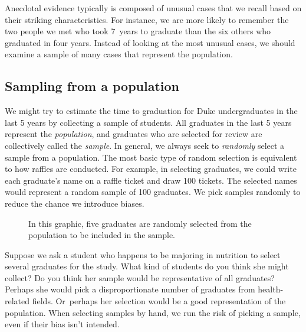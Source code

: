\D{\newpage}

Anecdotal evidence typically is composed of unusual cases that we recall based on their striking characteristics. For instance, we are more likely to remember the two people we met who took 7~years to graduate than the six others who graduated in four years. Instead of looking at the most unusual cases, we should examine a sample of many cases that represent the population.

\subsection{Sampling from a population}


We might try to estimate the time to graduation for Duke
undergraduates in the last 5 years by collecting a sample
of students.
All graduates in the last 5 years represent the
\emph{population}, and graduates who are
selected for review are collectively called the
\emph{sample}.
In general, we always seek to \emph{randomly} select a sample
from a population.
The most basic type of random selection is equivalent to how
raffles are conducted.
For example, in selecting graduates, we could write each
graduate's name on a raffle ticket and draw 100 tickets.
The selected names would represent a random sample of 100 graduates.
We pick samples randomly to reduce the chance we introduce biases.

\begin{figure}[ht]
  \centering
  \caption{In this graphic, five graduates are randomly
      selected from the population to be included in the
      sample.}
  \label{popToSampleGraduates}
\end{figure}

\begin{examplewrap}
\begin{nexample}{Suppose we ask a student who happens to be
    majoring in nutrition to select several graduates for
    the study.
    What kind of students do you think she might collect?
    Do you think her sample would be representative of all
    graduates?}
  Perhaps she would pick a disproportionate number of graduates
  from health-related fields.
  Or~perhaps her selection would be a good representation
  of the population.
  When selecting samples by hand, we run the risk of picking
  a  sample, even if their bias
  isn't intended.
\end{nexample}
\end{examplewrap}

